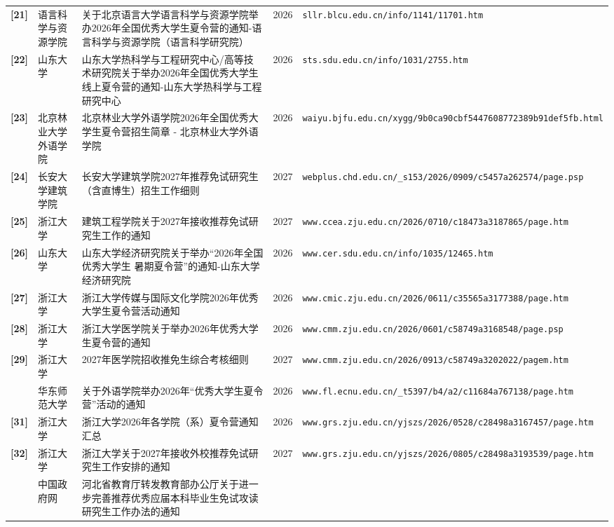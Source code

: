 {\begin{longtable}{@{}p{1.15cm}p{2.9cm}p{6.3cm}p{0.85cm}p{5.0cm}@{}}
\textbf{[21]} & 语言科学与资源学院 & 关于北京语言大学语言科学与资源学院举办2026年全国优秀大学生夏令营的通知-语言科学与资源学院（语言科学研究院） & 2026 & \texttt{sllr.blcu.edu.cn/info/1141/11701.htm} \\
\textbf{[22]} & 山东大学 & 山东大学热科学与工程研究中心/高等技术研究院关于举办2026年全国优秀大学生线上夏令营的通知-山东大学热科学与工程研究中心 & 2026 & \texttt{sts.sdu.edu.cn/info/1031/2755.htm} \\
\textbf{[23]} & 北京林业大学外语学院 & 北京林业大学外语学院2026年全国优秀大学生夏令营招生简章 - 北京林业大学外语学院 & 2026 & \texttt{waiyu.bjfu.edu.cn/xygg/9b0ca90cbf5447608772389b91def5fb.html} \\
\textbf{[24]} & 长安大学建筑学院 & 长安大学建筑学院2027年推荐免试研究生（含直博生）招生工作细则 & 2027 & \texttt{webplus.chd.edu.cn/\_s153/2026/0909/c5457a262574/page.psp} \\
\textbf{[25]} & 浙江大学 & 建筑工程学院关于2027年接收推荐免试研究生工作的通知 & 2027 & \texttt{www.ccea.zju.edu.cn/2026/0710/c18473a3187865/page.htm} \\
\textbf{[26]} & 山东大学 & 山东大学经济研究院关于举办“2026年全国优秀大学生 暑期夏令营”的通知-山东大学经济研究院 & 2026 & \texttt{www.cer.sdu.edu.cn/info/1035/12465.htm} \\
\textbf{[27]} & 浙江大学 & 浙江大学传媒与国际文化学院2026年优秀大学生夏令营活动通知 & 2026 & \texttt{www.cmic.zju.edu.cn/2026/0611/c35565a3177388/page.htm} \\
\textbf{[28]} & 浙江大学 & 浙江大学医学院关于举办2026年优秀大学生夏令营的通知 & 2026 & \texttt{www.cmm.zju.edu.cn/2026/0601/c58749a3168548/page.psp} \\
\textbf{[29]} & 浙江大学 & 2027年医学院招收推免生综合考核细则 & 2027 & \texttt{www.cmm.zju.edu.cn/2026/0913/c58749a3202022/pagem.htm} \\
[30] & 华东师范大学 & 关于外语学院举办2026年“优秀大学生夏令营”活动的通知 & 2026 & \texttt{www.fl.ecnu.edu.cn/\_t5397/b4/a2/c11684a767138/page.htm} \\
\textbf{[31]} & 浙江大学 & 浙江大学2026年各学院（系）夏令营通知汇总 & 2026 & \texttt{www.grs.zju.edu.cn/yjszs/2026/0528/c28498a3167457/page.htm} \\
\textbf{[32]} & 浙江大学 & 浙江大学关于2027年接收外校推荐免试研究生工作安排的通知 & 2027 & \texttt{www.grs.zju.edu.cn/yjszs/2026/0805/c28498a3193539/page.htm} \\
[33] & 中国政府网 & 河北省教育厅转发教育部办公厅关于进一步完善推荐优秀应届本科毕业生免试攻读研究生工作办法的通知

\end{longtable}}
